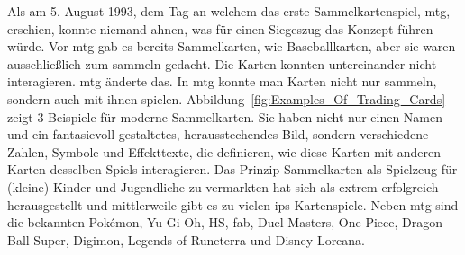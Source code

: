 \documentclass[fontsize=12, a4aper]{scrartcl}
\begin{document}
Als am 5. August 1993, dem Tag an welchem das erste Sammelkartenspiel, \ac{mtg}, erschien, konnte niemand ahnen, was für einen Siegeszug das Konzept führen würde. Vor \ac{mtg} gab es bereits Sammelkarten, wie Baseballkarten, aber sie waren ausschließlich zum sammeln gedacht. Die Karten konnten untereinander nicht interagieren. \ac{mtg} änderte das. In \ac{mtg} konnte man Karten nicht nur sammeln, sondern auch mit ihnen spielen. Abbildung~\ref{fig:Examples_Of_Trading_Cards} zeigt 3 Beispiele für moderne Sammelkarten. Sie haben nicht nur einen Namen und ein fantasievoll gestaltetes, herausstechendes Bild, sondern verschiedene Zahlen, Symbole und Effekttexte, die definieren, wie diese Karten mit anderen Karten desselben Spiels interagieren. Das Prinzip Sammelkarten als Spielzeug für (kleine) Kinder und Jugendliche zu vermarkten hat sich als extrem erfolgreich herausgestellt und mittlerweile gibt es zu vielen \acp{ip} Kartenspiele. Neben \ac{mtg} sind die bekannten Pok\'emon, Yu-Gi-Oh, \ac{HS}, \ac{fab}, Duel Masters, One Piece, Dragon Ball Super, Digimon, Legends of Runeterra und Disney Lorcana.
\end{document}
